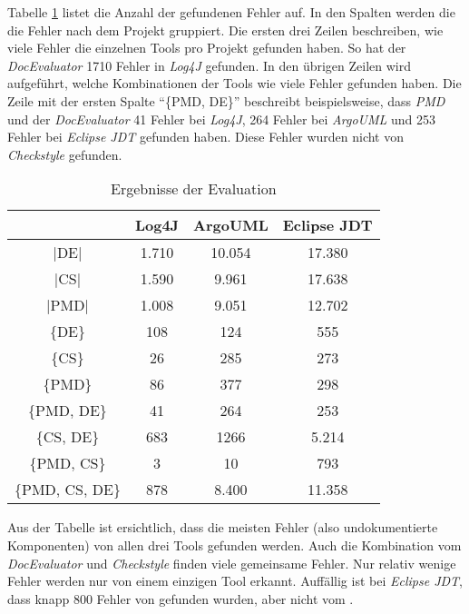 Tabelle \ref{tab:eval_results} listet die Anzahl der gefundenen Fehler auf. In den Spalten werden die die Fehler nach dem Projekt gruppiert. Die ersten drei Zeilen beschreiben, wie viele Fehler die einzelnen Tools pro Projekt gefunden haben. So hat  der \textit{DocEvaluator} 1710 Fehler in \textit{Log4J} gefunden.  In den übrigen Zeilen wird aufgeführt, welche Kombinationen der Tools wie viele Fehler gefunden haben. Die Zeile mit der ersten Spalte \enquote{\{PMD, DE\}} beschreibt beispielsweise, dass \textit{PMD} und der  \textit{DocEvaluator} 41 Fehler bei \textit{Log4J}, 264 Fehler bei \textit{ArgoUML} und 253 Fehler bei \textit{Eclipse JDT} gefunden haben. Diese Fehler wurden nicht von \textit{Checkstyle} gefunden.  
\begin{table}[]
    \centering
\begin{tabular}{c|c|c|c}
          & Log4J & ArgoUML & Eclipse JDT \\ \hline
|DE|            & 1.710 & 10.054  & 17.380      \\ \hline
|CS|            & 1.590 & 9.961   & 17.638      \\ \hline
|PMD|           & 1.008 & 9.051   & 12.702      \\ \hline\hline
\{DE\}          & 108   & 124     & 555         \\ \hline
\{CS\}          & 26    & 285     & 273         \\ \hline
\{PMD\}         & 86    & 377     & 298         \\ \hline
\{PMD, DE\}     & 41    & 264     & 253         \\ \hline
\{CS, DE\}      & 683   & 1266    & 5.214       \\ \hline
\{PMD, CS\}     & 3     & 10      & 793         \\ \hline
\{PMD, CS, DE\} & 878   & 8.400   & 11.358      \\ \hline
\end{tabular}
    \caption{Ergebnisse der Evaluation}
    \label{tab:eval_results}
\end{table}

Aus der Tabelle ist ersichtlich, dass die meisten Fehler (also undokumentierte Komponenten) von allen drei Tools gefunden werden. Auch die Kombination vom \textit{DocEvaluator} und \textit{Checkstyle} finden viele gemeinsame Fehler. Nur relativ wenige Fehler werden nur von einem einzigen Tool erkannt. Auffällig ist bei \textit{Eclipse JDT}, dass knapp 800 Fehler von \checkpmd gefunden wurden, aber nicht vom \doceval. 

